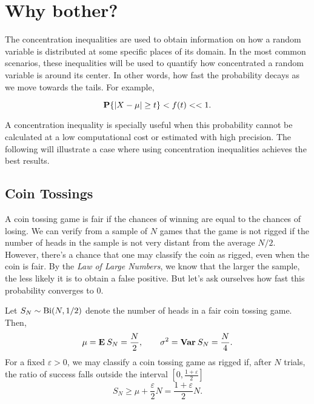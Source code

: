   


\vspace*{2em}

\section{Why bother?}

The concentration inequalities are used to obtain information on how a random variable is distributed at some specific places of its domain. In the most common scenarios, these inequalities will be used to quantify how concentrated a random variable is around its center. In other words, how fast the probability decays as we move towards the tails. For example,

\[ \P\{|X-\mu| \geq t\} < f(t) << 1. \]

A concentration inequality is specially useful when this probability cannot be calculated at a low computational cost or estimated with high precision. The following  will illustrate a case where using concentration inequalities achieves the best results.

\subsection{Coin Tossings}

A coin tossing game is fair if the chances of winning are equal to the chances of losing. We can verify from a sample of $N$ games that the game is not rigged if the number of heads in the sample is not very distant from the average $N/2$. However, there's a chance that one may classify the coin as rigged, even when the coin is fair. By the \textit{Law of Large Numbers}, we know that the larger the sample, the less likely it is to obtain a false positive. But let's ask ourselves how fast this probability converges to 0.

\vspace*{1em}

Let $S_N \sim \Bi(N,1/2)$ denote the number of heads in a fair coin tossing game. Then,
\[ \mu = \E S_N = \frac{N}{2}, \hspace*{2em} \sigma^2 = \Var S_N = \frac{N}{4}. \] 
For a fixed $\varepsilon > 0$, we may classify a coin tossing game as rigged if, after $N$ trials, the ratio of success falls outside the interval $[0, \tfrac{1+\varepsilon}{2}]$
\[ S_N \geq \mu +  \frac{\varepsilon}{2} N = \frac{1+\varepsilon}{2} N. \]

